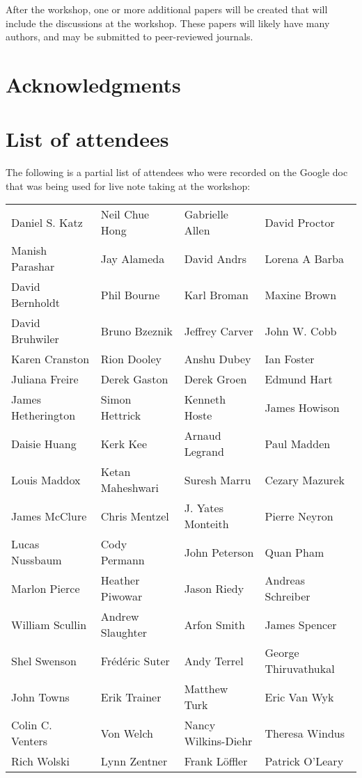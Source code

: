 \documentclass[11pt, oneside]{amsart}
\begin{document}
After the workshop, one or more additional papers will be created that will include the discussions at 
the workshop. These papers will likely have many authors, and may be submitted to peer-reviewed 
journals.


\section*{Acknowledgments}

\appendix
\section{List of attendees}

The following is a partial list of attendees who were recorded on the Google doc that was being used for live note taking at the workshop:

\begin{tabular}{ L{4cm}  L{4cm}  L{4cm}  L{4cm} }
   Daniel S. Katz
&  Neil Chue Hong
&  Gabrielle Allen
&  David Proctor
\\ Manish Parashar
&  Jay Alameda
&  David Andrs
&  Lorena A Barba
\\ David Bernholdt
&  Phil Bourne
&  Karl Broman
&  Maxine Brown
\\ David Bruhwiler
&  Bruno Bzeznik
&  Jeffrey Carver
&  John W. Cobb
\\ Karen Cranston
&  Rion Dooley
&  Anshu Dubey
&  Ian Foster
\\Juliana Freire
& Derek Gaston
& Derek Groen
& Edmund Hart
\\James Hetherington
& Simon Hettrick
& Kenneth Hoste
& James Howison
\\Daisie Huang
& Kerk Kee
& Arnaud Legrand
& Paul Madden
\\Louis Maddox
& Ketan Maheshwari
& Suresh Marru
& Cezary Mazurek
\\James McClure
& Chris Mentzel
& J. Yates Monteith
& Pierre Neyron
\\Lucas Nussbaum
& Cody Permann
& John Peterson
& Quan Pham
\\Marlon Pierce
& Heather Piwowar
& Jason Riedy
& Andreas Schreiber
\\William Scullin
& Andrew Slaughter
& Arfon Smith
& James Spencer
\\Shel Swenson
& Fr\'{e}d\'{e}ric Suter
& Andy Terrel
& George  Thiruvathukal
\\John Towns
& Erik Trainer
& Matthew Turk
& Eric Van Wyk
\\Colin C. Venters
& Von Welch
& Nancy Wilkins-Diehr
& Theresa Windus
\\Rich Wolski
& Lynn Zentner
& Frank Löffler
& Patrick O'Leary
\end{tabular} 






\end{document}
